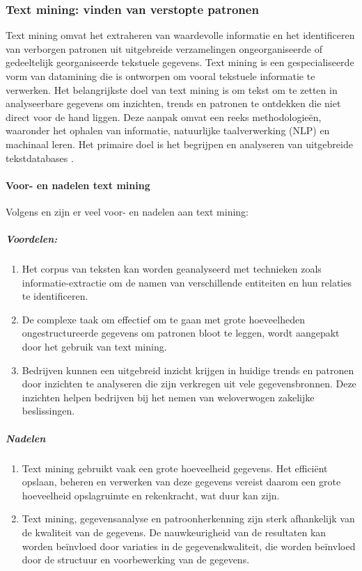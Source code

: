\subsubsection{Text mining: vinden van verstopte patronen}
Text mining omvat het extraheren van waardevolle informatie en het identificeren van verborgen patronen uit uitgebreide verzamelingen ongeorganiseerde of gedeeltelijk georganiseerde tekstuele gegevens. Text mining is een gespecialiseerde vorm van datamining die is ontworpen om vooral tekstuele informatie te verwerken. Het belangrijkste doel van text mining is om tekst om te zetten in analyseerbare gegevens om inzichten, trends en patronen te ontdekken die niet direct voor de hand liggen. Deze aanpak omvat een reeks methodologieën, waaronder het ophalen van informatie, natuurlijke taalverwerking (NLP) en machinaal leren. Het primaire doel is het begrijpen en analyseren van uitgebreide tekstdatabases \autocite{gaikwad2014text}.

\paragraph{Voor- en nadelen text mining}
Volgens \autocite{Kinter2024} en \autocite{gaikwad2014text} zijn er veel voor- en nadelen aan text mining:
\subparagraph{Voordelen:}
\begin{enumerate}
    \item Het corpus van teksten kan worden geanalyseerd met technieken zoals informatie-extractie om de namen van verschillende entiteiten en hun relaties te identificeren. 
    \item De complexe taak om effectief om te gaan met grote hoeveelheden ongestructureerde gegevens om patronen bloot te leggen, wordt aangepakt door het gebruik van text mining.
    \item Bedrijven kunnen een uitgebreid inzicht krijgen in huidige trends en patronen door inzichten te analyseren die zijn verkregen uit vele gegevensbronnen. Deze inzichten helpen bedrijven bij het nemen van weloverwogen zakelijke beslissingen.
    
\end{enumerate}
\subparagraph{Nadelen}
\begin{enumerate}
    \item Text mining gebruikt vaak een grote hoeveelheid gegevens. Het efficiënt opslaan, beheren en verwerken van deze gegevens vereist daarom een grote hoeveelheid opslagruimte en rekenkracht, wat duur kan zijn.
    \item Text mining, gegevensanalyse en patroonherkenning zijn sterk afhankelijk van de kwaliteit van de gegevens. De nauwkeurigheid van de resultaten kan worden beïnvloed door variaties in de gegevenskwaliteit, die worden beïnvloed door de structuur en voorbewerking van de gegevens.
\end{enumerate}


